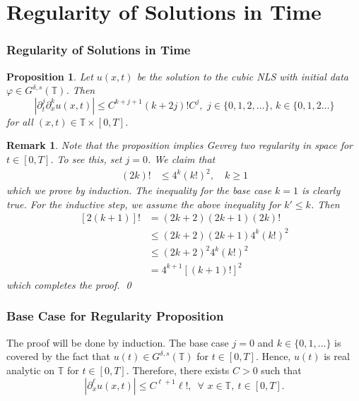 \documentclass{beamer}
\numberwithin{equation}{section}
\newcommand{\ci}{\mathbb{T}}
\newtheorem{proposition}{Proposition}
\newtheorem{remark}{Remark}
\begin{document}
\section{Regularity of Solutions in Time}
\begin{frame}
  \frametitle{Regularity of Solutions in Time}
%
%
%
\begin{proposition}
\label{fderivative}
Let  $u(x,t)$ be the solution to the cubic NLS 
with initial data  $\varphi\in G^{\delta, s}(\mathbb{T})$. 
Then
\begin{equation*}
 \left |
\partial_t^j\partial_x^k u(x,t)\right | \leq
C^{k+j+1}(k+2j)! C^j,\,\,j\in \{0,1,2,\dots\},\,k
\in \{0,1,2\dots\}
\end{equation*}
for all $(x,t)\in \mathbb{T}\times [0,T]$.
\end{proposition}
\end{frame}
%
%
\begin{frame}
%
%
\begin{remark}
Note that the proposition implies Gevrey two regularity in space for $t \in
[0, T]$. To see this, set $j = 0$. We claim that
%
%
\begin{equation*}
\begin{split}
(2k)!
& \le 4^{k} (k!)^{2}, \quad k \ge 1
\end{split}
\end{equation*}
%
%
\pause
which we prove by induction. The inequality for the base case $k=1$ is clearly
true. For the inductive step, we assume the above inequality for $k' \le k$. Then
%
%
\begin{equation*}
\begin{split}
[2(k+1)]!
& = (2k+2)(2k+1)(2k)! 
\\
& \le (2k+2)(2k+1)4^{k}(k!)^{2}
\\
& \le (2k+2)^{2}4^{k}(k!)^{2}
\\
& = 4^{k+1} [(k+1)!]^{2}
\end{split}
\end{equation*}
%
%
which completes the proof. \qed
\label{rem:implication-gev}
\end{remark}
%
%
\end{frame}
\begin{frame}
  \frametitle{Base Case for Regularity Proposition}
The proof will be
done by induction. The base case $j=0$ and $k\in \{0,1,\dots \}$ 
is covered by the fact that $u(t) \in G^{\delta, s}(\mathbb{T})$ for $t \in
[0, T]$. Hence, $u(t)$ is real analytic on $\ci$ for $t \in [0, T]$. Therefore, there
exists $C>0$ such that 
%
\begin{equation*}
|\partial_x^\ell u(x,t)|\leq
C^{\ell+1}\ell!,\,\,\,\forall\,\,x\in \mathbb{T}, \ t \in [0, T].
\end{equation*}
\end{frame}
\end{document}
